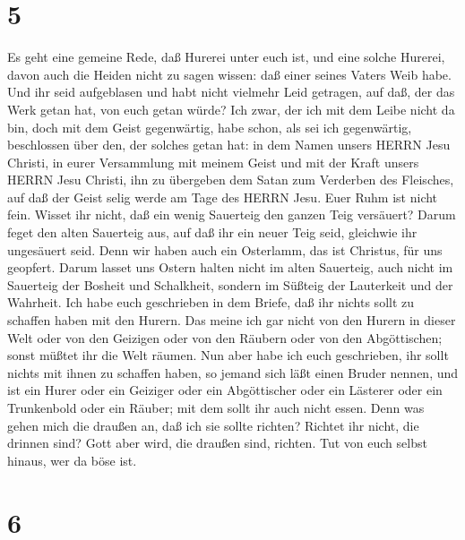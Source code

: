 \hypertarget{section-4}{%
\section{5}\label{section-4}}

 Es geht eine gemeine Rede, daß Hurerei unter euch ist, und
eine solche Hurerei, davon auch die Heiden nicht zu sagen wissen: daß
einer seines Vaters Weib habe.  Und ihr seid aufgeblasen und
habt nicht vielmehr Leid getragen, auf daß, der das Werk getan hat, von
euch getan würde?  Ich zwar, der ich mit dem Leibe nicht da
bin, doch mit dem Geist gegenwärtig, habe schon, als sei ich
gegenwärtig, beschlossen über den, der solches getan hat: 
in dem Namen unsers HERRN Jesu Christi, in eurer Versammlung mit meinem
Geist und mit der Kraft unsers HERRN Jesu Christi,  ihn zu
übergeben dem Satan zum Verderben des Fleisches, auf daß der Geist selig
werde am Tage des HERRN Jesu.  Euer Ruhm ist nicht fein.
Wisset ihr nicht, daß ein wenig Sauerteig den ganzen Teig versäuert?
 Darum feget den alten Sauerteig aus, auf daß ihr ein neuer
Teig seid, gleichwie ihr ungesäuert seid. Denn wir haben auch ein
Osterlamm, das ist Christus, für uns geopfert.  Darum lasset
uns Ostern halten nicht im alten Sauerteig, auch nicht im Sauerteig der
Bosheit und Schalkheit, sondern im Süßteig der Lauterkeit und der
Wahrheit.  Ich habe euch geschrieben in dem Briefe, daß ihr
nichts sollt zu schaffen haben mit den Hurern.  Das meine
ich gar nicht von den Hurern in dieser Welt oder von den Geizigen oder
von den Räubern oder von den Abgöttischen; sonst müßtet ihr die Welt
räumen.  Nun aber habe ich euch geschrieben, ihr sollt
nichts mit ihnen zu schaffen haben, so jemand sich läßt einen Bruder
nennen, und ist ein Hurer oder ein Geiziger oder ein Abgöttischer oder
ein Lästerer oder ein Trunkenbold oder ein Räuber; mit dem sollt ihr
auch nicht essen.  Denn was gehen mich die draußen an, daß
ich sie sollte richten? Richtet ihr nicht, die drinnen sind?
 Gott aber wird, die draußen sind, richten. Tut von euch
selbst hinaus, wer da böse ist.

\hypertarget{section-5}{%
\section{6}\label{section-5}}

